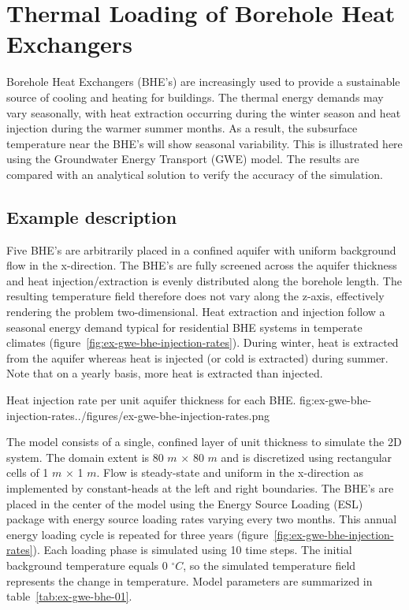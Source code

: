 \section{Thermal Loading of Borehole Heat Exchangers}

Borehole Heat Exchangers (BHE's) are increasingly used to provide a sustainable source of cooling and heating for buildings. The thermal energy demands may vary seasonally, with heat extraction occurring during the winter season and heat injection during the warmer summer months. As a result, the subsurface temperature near the BHE's will show seasonal variability. This is illustrated here using the Groundwater Energy Transport (GWE) model. The results are compared with an analytical solution to verify the accuracy of the \mf simulation. 

\subsection{Example description}

Five BHE's are arbitrarily placed in a confined aquifer with uniform background flow in the x-direction. The BHE's are fully screened across the aquifer thickness and heat injection/extraction is evenly distributed along the borehole length. The resulting temperature field therefore does not vary along the z-axis, effectively rendering the problem two-dimensional. Heat extraction and injection follow a seasonal energy demand typical for residential BHE systems in temperate climates (figure~\ref{fig:ex-gwe-bhe-injection-rates}). During winter, heat is extracted from the aquifer whereas heat is injected (or cold is extracted) during summer. Note that on a yearly basis, more heat is extracted than injected.

\begin{StandardFigure}{
    Heat injection rate per unit aquifer thickness for each BHE.
    }{fig:ex-gwe-bhe-injection-rates}{../figures/ex-gwe-bhe-injection-rates.png}
\end{StandardFigure}                                 

The \mf model consists of a single, confined layer of unit thickness to simulate the 2D system. The domain extent is 80 $m$ $\times$ 80 $m$ and is discretized using rectangular cells of 1 $m$ $\times$ 1 $m$. Flow is steady-state and uniform in the x-direction as implemented by constant-heads at the left and right boundaries. The BHE's are placed in the center of the model using the Energy Source Loading (ESL) package with energy source loading rates varying every two months. This annual energy loading cycle is repeated for three years (figure~\ref{fig:ex-gwe-bhe-injection-rates}). Each loading phase is simulated using 10 time steps. The initial background temperature equals 0 $^{\circ} C$, so the simulated temperature field represents the change in temperature. Model parameters are summarized in table~\ref{tab:ex-gwe-bhe-01}.

